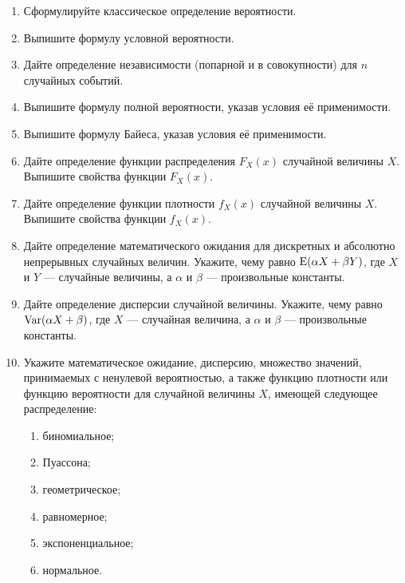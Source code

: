 \begin{enumerate}
	\item Сформулируйте классическое определение вероятности.
	\item Выпишите формулу условной вероятности.
	\item Дайте определение независимости (попарной и в совокупности) для $n$ случайных событий.
	\item Выпишите формулу полной вероятности, указав условия её применимости.
	\item Выпишите формулу Байеса, указав условия её применимости.
	\item Дайте определение функции распределения $F_{X}(x)$ случайной величины $X$. 
	Выпишите свойства функции $F_{X}(x)$. 
	\item Дайте определение функции плотности $f_{X}(x)$ случайной величины $X$. 
	Выпишите свойства функции $f_{X}(x)$.
	\item Дайте определение математического ожидания для дискретных и абсолютно непрерывных случайных величин. 
	Укажите, чему равно $\operatorname{E}(\alpha X+\beta Y)$, где $X$ и $Y$ — случайные величины, а $\alpha$ и $\beta$ — произвольные константы.
	\item Дайте определение дисперсии случайной величины. 
	Укажите, чему равно $\operatorname{Var}(\alpha X+\beta)$, где $X$ — случайная величина, 
	а $\alpha$ и $\beta$ — произвольные константы.
	\item Укажите математическое ожидание, дисперсию, множество значений, 
	принимаемых с ненулевой вероятностью, а также функцию плотности или функцию вероятности для случайной величины $X$, 
	имеющей следующее распределение:
	\begin{enumerate}
	\item биномиальное;
	\item Пуассона;
	\item геометрическое;
	\item равномерное;
	\item экспоненциальное;
	\item нормальное.
	\end{enumerate}


\end{enumerate}
